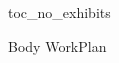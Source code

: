 \documentclass[12pt,letterpaper]{article}
\newcounter{exhibit}
\begin{document}

    {toc_no_exhibits}

    {Body}
    {WorkPlan}
\end{document}

